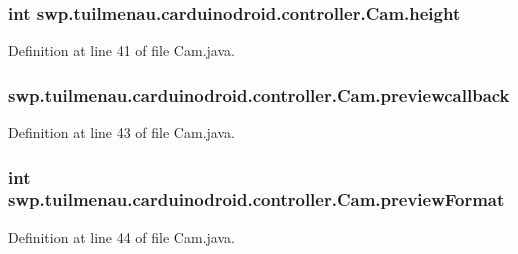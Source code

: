 \subsubsection[{height}]{\setlength{\rightskip}{0pt plus 5cm}int swp.\+tuilmenau.\+carduinodroid.\+controller.\+Cam.\+height}\label{classswp_1_1tuilmenau_1_1carduinodroid_1_1controller_1_1_cam_afbdbc0ff324563f628c5f90f181aa738}


Definition at line 41 of file Cam.\+java.

\hypertarget{classswp_1_1tuilmenau_1_1carduinodroid_1_1controller_1_1_cam_abcf8e504ac5062bb476d248babaa5407}{}
\subsubsection[{previewcallback}]{ swp.\+tuilmenau.\+carduinodroid.\+controller.\+Cam.\+previewcallback}\label{classswp_1_1tuilmenau_1_1carduinodroid_1_1controller_1_1_cam_abcf8e504ac5062bb476d248babaa5407}


Definition at line 43 of file Cam.\+java.

\hypertarget{classswp_1_1tuilmenau_1_1carduinodroid_1_1controller_1_1_cam_a3ef6ca3a108f8e7e2a4e1a0824bf8dc4}{}
\subsubsection[{preview\+Format}]{\setlength{\rightskip}{0pt plus 5cm}int swp.\+tuilmenau.\+carduinodroid.\+controller.\+Cam.\+preview\+Format}\label{classswp_1_1tuilmenau_1_1carduinodroid_1_1controller_1_1_cam_a3ef6ca3a108f8e7e2a4e1a0824bf8dc4}


Definition at line 44 of file Cam.\+java.

\hypertarget{classswp_1_1tuilmenau_1_1carduinodroid_1_1controller_1_1_cam_ac546b52ac9a2eb30e64c9ddd28872cdc}{}
